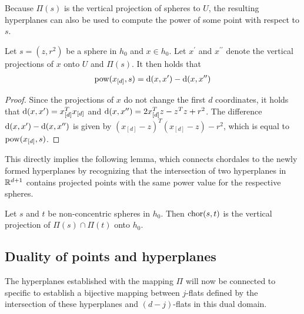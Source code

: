 Because $\Pi(s)$ is the vertical projection of spheres to $U$, the resulting hyperplanes can also be used to compute the power of some point with respect to $s$.
\begin{lemma}
    \label{lem:distances}
    Let $s = (z, r^2)$ be a sphere in $h_0$ and $x \in h_0$.
    Let $x^\prime$ and $x^{\prime\prime}$ denote the vertical projections of $x$ onto $U$ and $\Pi(s)$. It then holds that
    \begin{align}
        \operatorname{pow}(x_{[d]}, s) = \operatorname{d}(x, x^\prime) - \operatorname{d}(x, x^{\prime\prime})
    \end{align}
\end{lemma}
\begin{proof}
    Since the projections of $x$ do not change the first $d$ coordinates, it holds that $\operatorname{d}(x, x^\prime) = x_{[d]}^Tx_{[d]}$ and $\operatorname{d}(x, x^{\prime\prime}) = 2x_{[d]}^Tz - z^Tz + r^2$.
    The difference $\operatorname{d}(x, x^\prime) - \operatorname{d}(x, x^{\prime\prime})$ is given by $(x_{[d]} - z)^T(x_{[d]} - z) - r^2$, which is equal to $\operatorname{pow}(x_{[d]}, s)$.
\end{proof}

This directly implies the following lemma, which connects chordales to the newly formed hyperplanes by recognizing that the intersection of two hyperplanes in $\mathbb{R}^{d+1}$ contains projected points with the same power value for the respective spheres.

\begin{lemma}
    \label{lem:verticalprojection}
    Let $s$ and $t$ be non-concentric spheres in $h_0$.
    Then $\operatorname{chor}(s, t)$ is the vertical projection of $\Pi(s) \cap \Pi(t)$ onto $h_0$.
\end{lemma}

\subsection{Duality of points and hyperplanes}
\label{sub:duality_of_points_and_hyperplanes}
The hyperplanes established with the mapping $\Pi$ will now be connected to specific  to establish a bijective mapping between $j$-flats defined by the intersection of these hyperplanes and $(d-j)$-flats in this dual domain.

